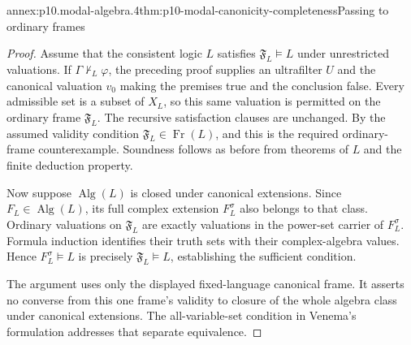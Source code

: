 \begin{annexitem}{annex:p10.modal-algebra.4}{thm:p10-modal-canonicity-completeness}{Passing to ordinary frames}
\begin{proof}
Assume that the consistent logic \(L\) satisfies
\(\mathfrak F_L\models L\) under unrestricted valuations.
If \(\Gamma\not\vdash_L\varphi\), the preceding proof supplies
an ultrafilter \(U\) and the canonical valuation \(v_0\)
making the premises true and the conclusion false.
Every admissible set is a subset of \(X_L\), so this same
valuation is permitted on the ordinary frame \(\mathfrak F_L\).
The recursive satisfaction clauses are unchanged.
By the assumed validity condition
\(\mathfrak F_L\in\operatorname{Fr}(L)\), and this is the
required ordinary-frame counterexample.
Soundness follows as before from theorems of \(L\) and the
finite deduction property.

Now suppose \(\operatorname{Alg}(L)\) is closed under canonical
extensions.  Since \(F_L\in\operatorname{Alg}(L)\), its full
complex extension \(F_L^\sigma\) also belongs to that class.
Ordinary valuations on \(\mathfrak F_L\) are exactly valuations
in the power-set carrier of \(F_L^\sigma\).
Formula induction identifies their truth sets with their
complex-algebra values.
Hence \(F_L^\sigma\models L\) is precisely
\(\mathfrak F_L\models L\), establishing the sufficient condition.

The argument uses only the displayed fixed-language canonical
frame.  It asserts no converse from this one frame's validity
to closure of the whole algebra class under canonical extensions.
The all-variable-set condition in Venema's formulation addresses
that separate equivalence.
\end{proof}
\end{annexitem}
